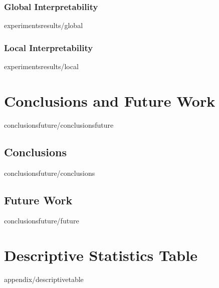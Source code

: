 \documentclass[covers, firstnumbered, tfg, extendedindex, epsbased, english, final]{tfgtfmthesisuam}
\begin{document}
\subsection{Global Interpretability}{experimentsresults/global}
\subsection{Local Interpretability}{experimentsresults/local}

\chapter{Conclusions and Future Work}{conclusionsfuture/conclusionsfuture}
\section{Conclusions}{conclusionsfuture/conclusions}
\section{Future Work}{conclusionsfuture/future}


\appendix

\chapter{Descriptive Statistics Table}{appendix/descriptivetable}
\end{document}
